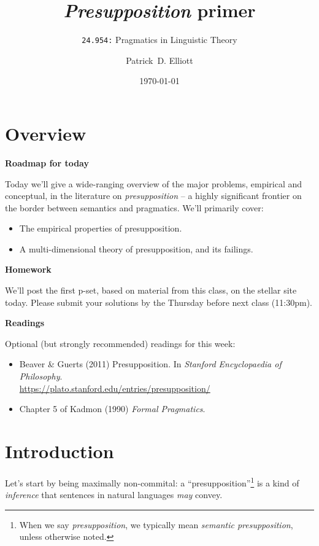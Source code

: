 \documentclass[cronos,landscape,paper=letter]{ling-handout}
\title{\textit{Presupposition} primer}
\subtitle{\texttt{24.954:} Pragmatics in Linguistic Theory}
\date{\today}
\author{Patrick~D. Elliott}
\begin{document}
\maketitle

\section{Overview}

\textbf{Roadmap for today}

Today we'll give a wide-ranging overview of the major problems, empirical and conceptual, in the literature on \textit{presupposition} -- a highly significant frontier on the border between semantics and pragmatics. We'll primarily cover:

\begin{itemize}

    \item The empirical properties of presupposition.

  \item A multi-dimensional theory of presupposition, and its failings.

\end{itemize}

\textbf{Homework}

We'll post the first p-set, based on material from this class, on the stellar site today. Please submit your solutions by the Thursday before next class (11:30pm).

\textbf{Readings}

Optional (but strongly recommended) readings for this week:

\begin{itemize}

  \item Beaver \& Guerts (2011) Presupposition. In \textit{Stanford Encyclopaedia of Philosophy}.\\
    \url{https://plato.stanford.edu/entries/presupposition/}

  \item Chapter 5 of Kadmon (1990) \textit{Formal Pragmatics}.

\end{itemize}

\section{Introduction}

Let's start by being maximally non-commital: a \enquote{presupposition}\footnote{When we say \textit{presupposition}, we typically mean \textit{semantic presupposition}, unless otherwise noted.} is a kind of \textit{inference} that sentences in natural languages \textit{may} convey.
\end{document}
